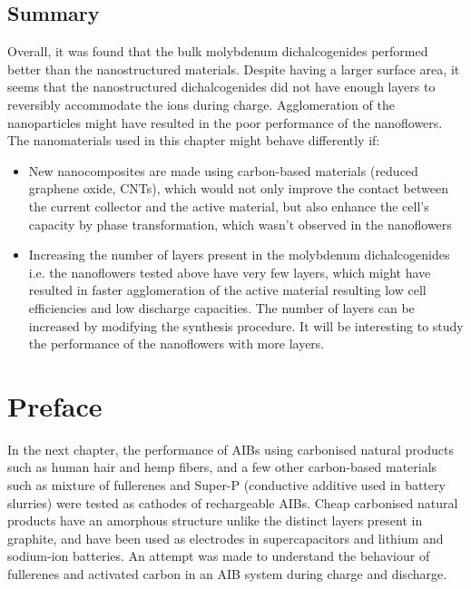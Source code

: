 \subsection{Summary}
Overall, it was found that the bulk molybdenum dichalcogenides performed better than the nanostructured materials. Despite having a larger surface area, it seems that the nanostructured dichalcogenides did not have enough layers to reversibly accommodate the  ions during charge. Agglomeration of the nanoparticles might have resulted in the poor performance of the nanoflowers. 
The nanomaterials used in this chapter might behave differently if:
\begin{itemize}
\item New nanocomposites are made using carbon-based materials (reduced graphene oxide, CNTs), which would not only improve the contact between the current collector and the active material, but also enhance the cell's capacity by phase transformation, which wasn't observed in the nanoflowers
\item Increasing the number of layers present in the molybdenum dichalcogenides i.e. the nanoflowers tested above have very few layers, which might have resulted in faster agglomeration of the active material resulting low cell efficiencies and low discharge capacities. The number of layers can be increased by modifying the synthesis procedure. It will be interesting to study the performance of the nanoflowers with more layers.
\end{itemize}












\newpage
\section*{Preface}
In the next chapter, the performance of AIBs using carbonised natural products such as human hair and hemp fibers, and a few other carbon-based materials such as mixture of fullerenes and Super-P (conductive additive used in battery slurries) were tested as cathodes of rechargeable AIBs. Cheap carbonised natural products have an amorphous structure unlike the distinct layers present in graphite, and have been used as electrodes in supercapacitors and lithium and sodium-ion batteries. An attempt was made to understand the behaviour of fullerenes and activated carbon in an AIB system during charge and discharge. 
